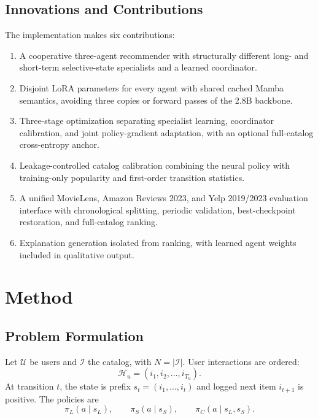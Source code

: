 \documentclass[11pt,a4paper]{article}
\begin{document}
\subsection{Innovations and Contributions}

The implementation makes six contributions:
\begin{enumerate}
  \item A cooperative three-agent recommender with structurally different long- and short-term selective-state specialists and a learned coordinator.
  \item Disjoint LoRA parameters for every agent with shared cached Mamba semantics, avoiding three copies or forward passes of the 2.8B backbone.
  \item Three-stage optimization separating specialist learning, coordinator calibration, and joint policy-gradient adaptation, with an optional full-catalog cross-entropy anchor.
  \item Leakage-controlled catalog calibration combining the neural policy with training-only popularity and first-order transition statistics.
  \item A unified MovieLens, Amazon Reviews 2023, and Yelp 2019/2023 evaluation interface with chronological splitting, periodic validation, best-checkpoint restoration, and full-catalog ranking.
  \item Explanation generation isolated from ranking, with learned agent weights included in qualitative output.
\end{enumerate}



\section{Method}

\subsection{Problem Formulation}

Let $\mathcal U$ be users and $\mathcal I$ the catalog, with $N=|\mathcal I|$. User interactions are ordered:
\begin{equation}
  \mathcal H_u=(i_1,i_2,\ldots,i_{T_u}).
\end{equation}
At transition $t$, the state is prefix $s_t=(i_1,\ldots,i_t)$ and logged next item $i_{t+1}$ is positive. The policies are
\begin{equation}
  \pi_L(a\mid s_L),\qquad
  \pi_S(a\mid s_S),\qquad
  \pi_C(a\mid s_L,s_S).
\end{equation}
\end{document}

